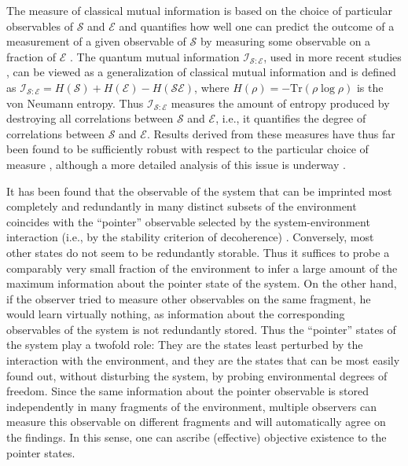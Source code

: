 \documentclass[12pt,aps,floatfix,amsmath,amssymb,showpacs,nofootinbib]{revtex4-2}
\begin{document}
The measure of classical mutual information is based on the choice of
particular observables of $\mathcal{S}$ and $\mathcal{E}$ and
quantifies how well one can predict the outcome of a measurement of a
given observable of $\mathcal{S}$ by measuring some observable on a
fraction of $\mathcal{E}$ \cite{Ollivier:2003:za,Ollivier:2004:im}.
The quantum mutual information
$\mathcal{I}_{\mathcal{S}:\mathcal{E}}$, used in more recent studies
\cite{Zurek:2002:ii,Blume:2004:oo,Blume:2005:oo}, can be viewed as a
generalization of classical mutual information and is defined as
$\mathcal{I}_{\mathcal{S}:\mathcal{E}} = H(\mathcal{S}) +
H(\mathcal{E}) - H(\mathcal{SE})$, where $H(\rho) = -\text{Tr} (\rho
\log \rho)$ is the von Neumann entropy. Thus
$\mathcal{I}_{\mathcal{S}:\mathcal{E}}$ measures the amount of entropy
produced by destroying all correlations between $\mathcal{S}$ and
$\mathcal{E}$, i.e., it quantifies the degree of correlations between
$\mathcal{S}$ and $\mathcal{E}$. Results derived from these measures
have thus far been found to be sufficiently robust with respect to the
particular
choice of measure \cite{Ollivier:2003:za,Ollivier:2004:im,Zurek:2002:ii,%
  Blume:2004:oo,Blume:2005:oo}, although a more detailed analysis of
this issue is underway \cite{Blume:2005:oo}.

It has been found that the observable of the system that can be
imprinted most completely and redundantly in many distinct subsets of
the environment coincides with the ``pointer'' observable selected by
the system-environment interaction (i.e., by the stability criterion
of decoherence)
\cite{Ollivier:2003:za,Ollivier:2004:im,Blume:2004:oo,Blume:2005:oo}.
Conversely, most other states do not seem to be redundantly storable.
Thus it suffices to probe a comparably very small fraction of the
environment to infer a large amount of the maximum information about
the pointer state of the system.  On the other hand, if the observer
tried to measure other observables on the same fragment, he would
learn virtually nothing, as information about the corresponding
observables of the system is not redundantly stored.  Thus the
``pointer'' states of the system play a twofold role: They are the
states least perturbed by the interaction with the environment, and
they are the states that can be most easily found out, without
disturbing the system, by probing environmental degrees of freedom.
Since the same information about the pointer observable is stored
independently in many fragments of the environment, multiple observers
can measure this observable on different fragments and will
automatically agree on the findings. In this sense, one can ascribe
(effective) objective existence to the pointer states.
\end{document}
